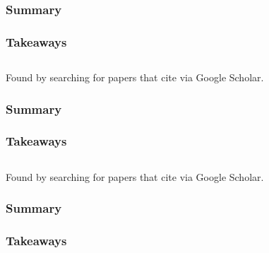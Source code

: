 \documentclass[
	letterpaper, %
]{jdf}
\begin{document}
\subsubsection{Summary}


\subsubsection{Takeaways}

\subsection{}

Found by searching for papers that cite \cite{important_adaptive_learning_exercise_generation} via Google Scholar.

\subsubsection{Summary}


\subsubsection{Takeaways}

\subsection{}
Found by searching for papers that cite \cite{important_adaptive_learning_exercise_generation} via Google Scholar.

\subsubsection{Summary}


\subsubsection{Takeaways}
\end{document}
